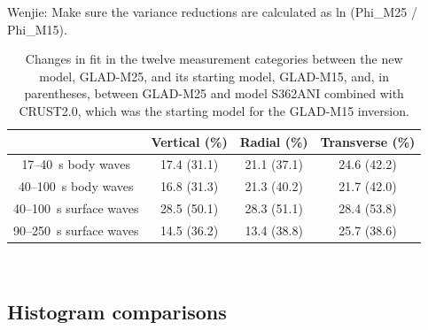 \documentclass[extra,mreferee]{gji}
\begin{document}
{\color{red} Wenjie: Make sure the variance reductions are calculated as ln (Phi\_M25 / Phi\_M15).}

\begin{table}[!htb]
  \centering
  \begin{tabular}{|c|c|c|c|}
    \hline
    ~          &  Vertical (\%) & Radial (\%) &  Transverse (\%) \\
    \hline
    17--40~s  body waves    &   17.4 (31.1)   &       21.1 (37.1) &       24.6 (42.2) \\
    40--100~s body waves    &   16.8 (31.3)  &       21.3 (40.2)  &       21.7 (42.0) \\
    40--100~s surface waves &   28.5 (50.1)  &       28.3 (51.1) &       28.4 (53.8)  \\
    90--250~s surface waves &   14.5 (36.2)  &       13.4 (38.8) &       25.7 (38.6) \\
    \hline
  \end{tabular}\\
  \caption{Changes in fit in the twelve measurement categories
between the new model, GLAD-M25, and its starting model, GLAD-M15, and, in parentheses, between GLAD-M25 and model S362ANI combined with CRUST2.0, which was the starting model for the GLAD-M15 inversion.}
  \label{table:misfit_reduction_M15_M25}
\end{table}


\subsection{Histogram comparisons}
\label{section:Histogram comparisons}
\end{document}
